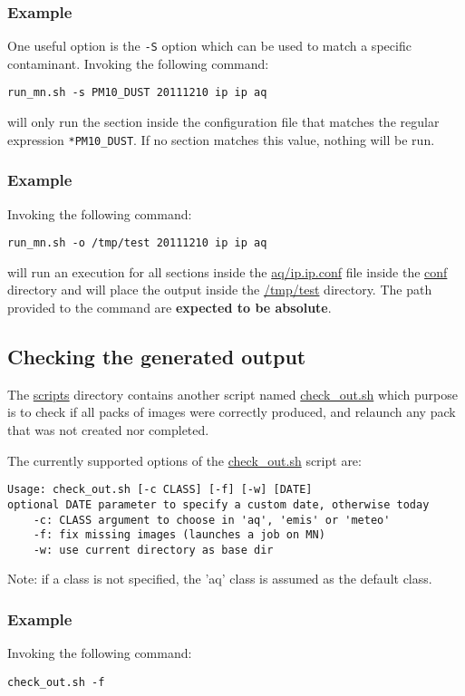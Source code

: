 \documentclass[11pt]{article}
\begin{document}
\subsubsection{Example}
One useful option is the \texttt{-S} option which can be used to match a specific contaminant. Invoking the following command: 
\begin{verbatim}
run_mn.sh -s PM10_DUST 20111210 ip ip aq
\end{verbatim}

will only run the section inside the configuration file that matches the regular expression \texttt{*PM10\_DUST}. If no section matches this value, nothing will be run. 

\subsubsection{Example}
Invoking the following command:
\begin{verbatim}
run_mn.sh -o /tmp/test 20111210 ip ip aq
\end{verbatim}
will run an execution for all sections inside the \url{aq/ip.ip.conf} file inside the \url{conf} directory and will place the output inside the \url{/tmp/test} directory. The path provided to the command are \textbf{expected to be absolute}.

\subsection{Checking the generated output}
\label{ssec:check-out}
The \url{scripts} directory contains another script named \url{check_out.sh} which purpose is to check if all packs of images were correctly produced, and relaunch any pack that was not created nor completed. 

The currently supported options of the \url{check_out.sh} script are: 
\begin{verbatim}
Usage: check_out.sh [-c CLASS] [-f] [-w] [DATE]
optional DATE parameter to specify a custom date, otherwise today
    -c: CLASS argument to choose in 'aq', 'emis' or 'meteo'
    -f: fix missing images (launches a job on MN)
    -w: use current directory as base dir
\end{verbatim}

Note: if a class is not specified, the 'aq' class is assumed as the default class. 

\subsubsection{Example}
Invoking the following command: 
\begin{verbatim}
check_out.sh -f 
\end{verbatim}
\end{document}
